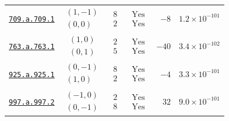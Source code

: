 \begin{table}[htbp]
\begin{tabular}{@{}lcccrr@{}}
\href{https://www.lmfdb.org/Genus2Curve/Q/709/a/709/1}{\texttt{709.a.709.1}} & $\begin{gathered}(1,-1)\\(0,0)\end{gathered}$ & $\begin{gathered}8\\2\end{gathered}$ & $\begin{gathered}\mathrm{Yes}\\\mathrm{Yes}\end{gathered}$ & $-8$ & $1.2\times 10^{-101}$ \\
\href{https://www.lmfdb.org/Genus2Curve/Q/763/a/763/1}{\texttt{763.a.763.1}} & $\begin{gathered}(1,0)\\(0,1)\end{gathered}$ & $\begin{gathered}2\\5\end{gathered}$ & $\begin{gathered}\mathrm{Yes}\\\mathrm{Yes}\end{gathered}$ & $-40$ & $3.4\times 10^{-102}$ \\
\href{https://www.lmfdb.org/Genus2Curve/Q/925/a/925/1}{\texttt{925.a.925.1}} & $\begin{gathered}(0,-1)\\(1,0)\end{gathered}$ & $\begin{gathered}8\\2\end{gathered}$ & $\begin{gathered}\mathrm{Yes}\\\mathrm{Yes}\end{gathered}$ & $-4$ & $3.3\times 10^{-101}$ \\
\href{https://www.lmfdb.org/Genus2Curve/Q/997/a/997/2}{\texttt{997.a.997.2}} & $\begin{gathered}(-1,0)\\(0,-1)\end{gathered}$ & $\begin{gathered}2\\8\end{gathered}$ & $\begin{gathered}\mathrm{Yes}\\\mathrm{Yes}\end{gathered}$ & $32$ & $9.0\times 10^{-101}$ \\

\end{tabular}
\end{table}
